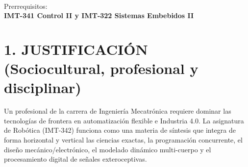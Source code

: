 \documentclass[11pt, letterpaper]{article}
\newcommand{\prereq}{IMT-341 Control II y IMT-322 Sistemas Embebidos II}
\newcommand{\creditos}{6}
\newcommand{\carga}{100 horas académicas}
\begin{document}
\begin{minipage}{\linewidth}
    \hfill%
     \\[0.15cm] 

    \begin{tcolorbox}[ovalstyle, width=\linewidth, halign=left]
        Prerrequisitos: \\
        \textbf{\prereq}
    \end{tcolorbox}
\end{minipage}

\vspace{0.6cm}

\section*{1. JUSTIFICACIÓN (Sociocultural, profesional y disciplinar)}

Un profesional de la carrera de Ingeniería Mecatrónica requiere dominar las tecnologías de frontera en automatización flexible e Industria 4.0. La asignatura de Robótica (IMT-342) funciona como una materia de síntesis que integra de forma horizontal y vertical las ciencias exactas, la programación concurrente, el diseño mecánico/electrónico, el modelado dinámico multi-cuerpo y el procesamiento digital de señales exteroceptivas.
\end{document}
